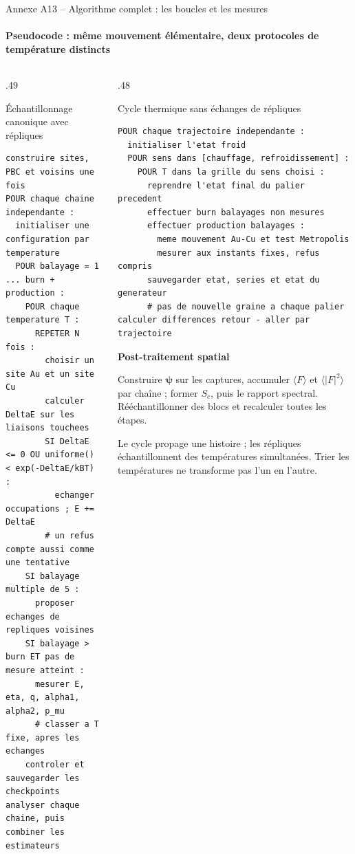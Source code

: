 \documentclass[aspectratio=169,10pt]{beamer}
\newcommand{\notecrit}[1]{\par\smallskip{\color{gold}\bfseries Lecture critique.} #1\par}
\begin{document}
\begin{frame}[t,fragile]{Annexe A13 -- Algorithme complet : les boucles et les mesures}
\framesubtitle{Pseudocode : même mouvement élémentaire, deux protocoles de température distincts}
\begin{columns}[T,onlytextwidth]
\begin{column}{.49\textwidth}
\begin{block}{Échantillonnage canonique avec répliques}
\fontsize{8}{9.3}\selectfont
\begin{verbatim}
construire sites, PBC et voisins une fois
POUR chaque chaine independante :
  initialiser une configuration par temperature
  POUR balayage = 1 ... burn + production :
    POUR chaque temperature T :
      REPETER N fois :
        choisir un site Au et un site Cu
        calculer DeltaE sur les liaisons touchees
        SI DeltaE <= 0 OU uniforme() < exp(-DeltaE/kBT) :
          echanger occupations ; E += DeltaE
        # un refus compte aussi comme une tentative
    SI balayage multiple de 5 :
      proposer echanges de repliques voisines
    SI balayage > burn ET pas de mesure atteint :
      mesurer E, eta, q, alpha1, alpha2, p_mu
      # classer a T fixe, apres les echanges
    controler et sauvegarder les checkpoints
analyser chaque chaine, puis combiner les estimateurs
\end{verbatim}
\end{block}
\end{column}
\begin{column}{.48\textwidth}
\begin{block}{Cycle thermique sans échanges de répliques}
\fontsize{8}{9.3}\selectfont
\begin{verbatim}
POUR chaque trajectoire independante :
  initialiser l'etat froid
  POUR sens dans [chauffage, refroidissement] :
    POUR T dans la grille du sens choisi :
      reprendre l'etat final du palier precedent
      effectuer burn balayages non mesures
      effectuer production balayages :
        meme mouvement Au-Cu et test Metropolis
        mesurer aux instants fixes, refus compris
      sauvegarder etat, series et etat du generateur
      # pas de nouvelle graine a chaque palier
calculer differences retour - aller par trajectoire
\end{verbatim}
\end{block}
\textbf{Post-traitement spatial}

Construire $\boldsymbol\psi$ sur les captures, accumuler $\langle F\rangle$ et $\langle|F|^2\rangle$ par chaîne ; former $S_c$, puis le rapport spectral. Rééchantillonner des blocs et recalculer toutes les étapes.
\notecrit{Le cycle propage une histoire ; les répliques échantillonnent des températures simultanées. Trier les températures ne transforme pas l'un en l'autre.}
\end{column}
\end{columns}
\end{frame}
\end{document}
